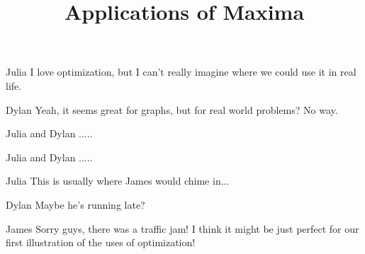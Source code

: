\documentclass{ximera}
\title{Applications of Maxima}
\begin{document}
\maketitle
\begin{dialogue}
\item[Julia] I love optimization, but I can't really imagine where we could use it in real life.
\item[Dylan] Yeah, it seems great for graphs, but for real world problems? No way.
\item[Julia and Dylan] .....
\item[Julia and Dylan] .....
\item[Julia] This is usually where James would chime in...
\item[Dylan] Maybe he's running late?
\item[James] Sorry guys, there was a traffic jam! I think it might be just perfect for our first illustration of the uses of optimization!
\end{dialogue}
\end{document}
